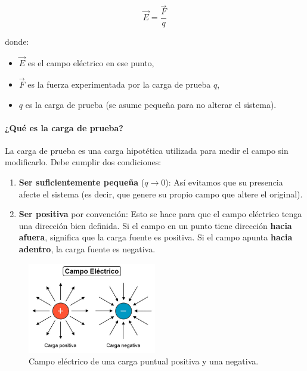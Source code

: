\begin{equation}
    \vec{E} = \frac{\vec{F}}{q}
    \label{eq:campo_electrico}
\end{equation}

donde:
\begin{itemize}
    \item \( \vec{E} \) es el campo eléctrico en ese punto,
    \item \( \vec{F} \) es la fuerza experimentada por la carga de prueba \( q \),
    \item \( q \) es la carga de prueba (se asume pequeña para no alterar el sistema).
\end{itemize}

\paragraph{¿Qué es la carga de prueba?}

La carga de prueba es una carga hipotética utilizada para medir el campo sin modificarlo. Debe cumplir dos condiciones:
\begin{enumerate}
    \item \textbf{Ser suficientemente pequeña} (\( q \to 0 \)): Así evitamos que su presencia afecte el sistema (es decir, que genere su propio campo que altere el original).
    \item \textbf{Ser positiva} por convención: Esto se hace para que el campo eléctrico tenga una dirección bien definida. Si el campo en un punto tiene dirección \textbf{hacia afuera}, significa que la carga fuente es positiva. Si el campo apunta \textbf{hacia adentro}, la carga fuente es negativa.
\end{enumerate}

\begin{figure}[ht]
    \centering
    \includegraphics[width=0.5\textwidth]{images/electric_field.jpg}
    \caption{Campo eléctrico de una carga puntual positiva y una negativa.}
    \label{fig:campo_electrico}
\end{figure}


